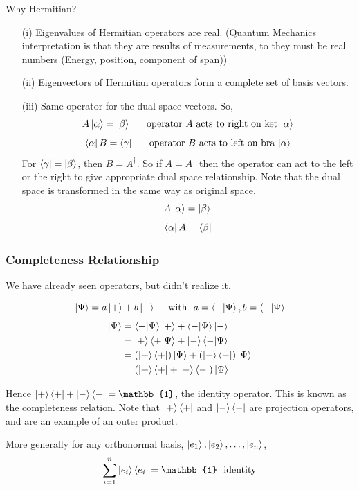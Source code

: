 \documentclass[english, 11pt]{article}
\begin{document}
        Why Hermitian?
        \begin{itemize}
          \item[(i)] Eigenvalues of Hermitian operators are real. (Quantum Mechanics interpretation is that they are results of measurements, to they must be real numbers (Energy, position, component of span))
          \item[(ii)] Eigenvectors of Hermitian operators form a complete set of basis vectors.
          \item[(iii)] Same operator for the dual space vectors. So,
          \[ A\left|\alpha\right\rangle = \left|\beta\right\rangle \ \ \ \ \ \mbox{operator $A$ acts to right on ket $\left|\alpha\right\rangle$} \]
          \[ \left\langle\alpha\right|B = \left\langle\gamma\right| \ \ \ \ \ \mbox{operator $B$ acts to left on bra $\left|\alpha\right\rangle$} \]
          For $\left\langle\gamma\right| = \left|\beta\right\rangle$, then $B = A^\dagger$. So if $A = A^\dagger$ then the operator can act to the left or the right to give appropriate dual space relationship. Note that the dual space is transformed in the same way as original space.
          \[ A\left|\alpha\right\rangle = \left| \beta \rangle \right. \]
          \[ \left\langle\alpha\right|A = \left\langle\beta\right| \]
        \end{itemize}

      \subsubsection{Completeness Relationship}

        We have already seen operators, but didn't realize it.

        \[ \ket{\Psi} = a\kp + b\km \mbox{ \ \ \ with \ } a = \braket{+}{\Psi}, b = \braket{-}{\Psi} \]
        \begin{align*}
          \ket{\Psi} & = \braket{+}{\Psi}\ket{+} + \braket{-}{\Psi}\km \\
          & = \kp\braket{+}{\Psi} + \ket{-}\braket{-}{\Psi} \\
          & = \left( \ket{+}\bra{+} \right) \ket{\Psi} + \left( \ket{-}\bra{-} \right) \ket{\Psi} \\
          & = \left( \ket{+}\bra{+} + \ket{-}\bra{-} \right)\ket{\Psi}
        \end{align*}

        Hence $\ket{+}\bra{+} + \ket{-}\bra{-} = \mathbb{1}$, the identity operator. This is known as the completeness relation. Note that $\left|+\right\rangle\left\langle+\right|$ and $\left|-\right\rangle\left\langle-\right|$ are projection operators, and are an example of an outer product.

        More generally for any orthonormal basis, $\left|e_1\right\rangle, \left|e_2\right\rangle, \ldots, \left|e_n\right\rangle$,
        \[ \sum_{i=1}^n \ket{e_i}\bra{e_i} = \mathbb{1} \ \ \mbox{identity} \]
\end{document}
